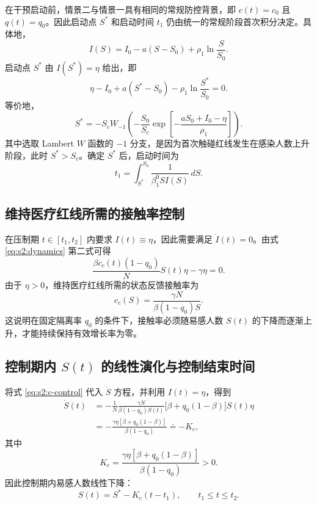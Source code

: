 在干预启动前，情景二与情景一具有相同的常规防控背景，即 $c(t)=c_0$ 且 $q(t)=q_0$。因此启动点 $S^*$ 和启动时间 $t_1$ 仍由统一的常规阶段首次积分决定。具体地，
\begin{equation}
I(S)
=
I_0-a(S-S_0)+\rho_1\ln\frac{S}{S_0}.
\label{eq:s2:I-of-S-baseline}
\end{equation}
启动点 $S^*$ 由 $I(S^*)=\eta$ 给出，即
\begin{equation}
\eta-I_0+a(S^*-S_0)-\rho_1\ln\frac{S^*}{S_0}=0.
\label{eq:s2:Sstar-equation}
\end{equation}
等价地，
\begin{equation}
S^*
=
-S_c W_{-1}\left(
-\frac{S_0}{S_c}
\exp\left[-\frac{aS_0+I_0-\eta}{\rho_1}\right]
\right).
\label{eq:s2:Sstar-lambert}
\end{equation}
其中选取 Lambert $W$ 函数的 $-1$ 分支，是因为首次触碰红线发生在感染人数上升阶段，此时 $S^*>S_c$。确定 $S^*$ 后，启动时间为
\begin{equation}
t_1
=
\int_{S^*}^{S_0}
\frac{1}{\beta_1^0 S I(S)}\,dS .
\label{eq:s2:t1}
\end{equation}

\subsection{维持医疗红线所需的接触率控制}

在压制期 $t\in[t_1,t_2]$ 内要求 $I(t)\equiv\eta$，因此需要满足 $\dot I(t)=0$。由式 \eqref{eq:s2:dynamics} 第二式可得
\begin{equation}
\frac{\beta c_c(t)(1-q_0)}{N}S(t)\eta-\gamma\eta=0.
\end{equation}
由于 $\eta>0$，维持医疗红线所需的状态反馈接触率为
\begin{equation}
c_c(S)
=
\frac{\gamma N}{\beta(1-q_0)S}.
\label{eq:s2:c-control}
\end{equation}
这说明在固定隔离率 $q_0$ 的条件下，接触率必须随易感人数 $S(t)$ 的下降而逐渐上升，才能持续保持有效增长率为零。

\subsection{控制期内 $S(t)$ 的线性演化与控制结束时间}

将式 \eqref{eq:s2:c-control} 代入 $\dot S$ 方程，并利用 $I(t)=\eta$，得到
\begin{align}
\dot S(t)
&=
-\frac{1}{N}
\frac{\gamma N}{\beta(1-q_0)S(t)}
\big[\beta+q_0(1-\beta)\big]S(t)\eta \nonumber\\
&=
-\frac{\gamma\eta[\beta+q_0(1-\beta)]}{\beta(1-q_0)}
\doteq -K_c,
\label{eq:s2:Sdot-phase2}
\end{align}
其中
\begin{equation}
K_c
=
\frac{\gamma\eta[\beta+q_0(1-\beta)]}{\beta(1-q_0)}>0.
\label{eq:s2:Kc}
\end{equation}
因此控制期内易感人数线性下降：
\begin{equation}
S(t)
=
S^*-K_c(t-t_1),
\qquad
t_1\leq t\leq t_2.
\label{eq:s2:S-linear}
\end{equation}

